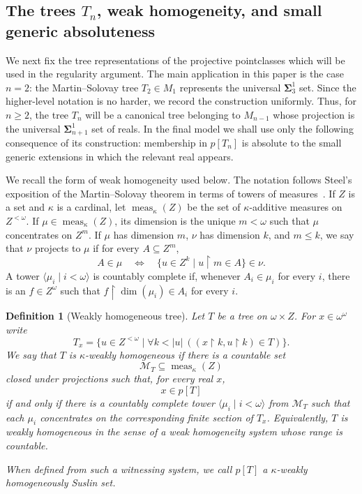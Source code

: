 \documentclass[a4paper,11pt]{article}
\newtheorem{definition}[theorem]{Definition}
\begin{document}
\subsection{The trees $T_n$, weak homogeneity, and small generic absoluteness}\label{subsec:tn-weak-homogeneity}

We next fix the tree representations of the projective pointclasses which will be used in the regularity argument.  The main application in this paper is the case $n=2$: the Martin--Solovay tree $T_2\in M_1$ represents the universal $\boldsymbol\Sigma^1_3$ set.  Since the higher-level notation is no harder, we record the construction uniformly.  Thus, for $n\geq 2$, the tree $T_n$ will be a canonical tree belonging to $M_{n-1}$ whose projection is the universal $\boldsymbol\Sigma^1_{n+1}$ set of reals.  In the final model we shall use only the following consequence of its construction: membership in $p[T_n]$ is absolute to the small generic extensions in which the relevant real appears.

We recall the form of weak homogeneity used below.  The notation follows Steel's exposition of the Martin--Solovay theorem in terms of towers of measures~\cite{steel2009derived}.  If $Z$ is a set and $\kappa$ is a cardinal, let $\operatorname{meas}_\kappa(Z)$ be the set of $\kappa$-additive measures on $Z^{<\omega}$.  If $\mu\in\operatorname{meas}_\kappa(Z)$, its dimension is the unique $m<\omega$ such that $\mu$ concentrates on $Z^m$.  If $\mu$ has dimension $m$, $\nu$ has dimension $k$, and $m\leq k$, we say that $\nu$ projects to $\mu$ if for every $A\subseteq Z^m$,
\[
   A\in\mu
   \quad\Longleftrightarrow\quad
   \{u\in Z^k\mid u\upharpoonright m\in A\}\in\nu .
\]
A tower $\langle\mu_i\mid i<\omega\rangle$ is countably complete if, whenever $A_i\in\mu_i$ for every $i$, there is an $f\in Z^\omega$ such that $f\upharpoonright\operatorname{dim}(\mu_i)\in A_i$ for every $i$.

\begin{definition}[Weakly homogeneous tree]\label{def:weakly-homogeneous-tree}
Let $T$ be a tree on $\omega\times Z$.  For $x\in\omega^\omega$ write
\[
   T_x=\{u\in Z^{<\omega}\mid \forall k<|u|\ ((x\upharpoonright k,u\upharpoonright k)\in T)\}.
\]
We say that $T$ is \emph{$\kappa$-weakly homogeneous} if there is a countable set
\[
   \mathcal M_T\subseteq\operatorname{meas}_\kappa(Z)
\]
closed under projections such that, for every real $x$,
\[
   x\in p[T]
\]
if and only if there is a countably complete tower $\langle\mu_i\mid i<\omega\rangle$ from $\mathcal M_T$ such that each $\mu_i$ concentrates on the corresponding finite section of $T_x$.  Equivalently, $T$ is weakly homogeneous in the sense of a weak homogeneity system whose range is countable.

When defined from such a witnessing system, we call $p[T]$ a $\kappa$-weakly homogeneously Suslin set.
\end{definition}
\end{document}
